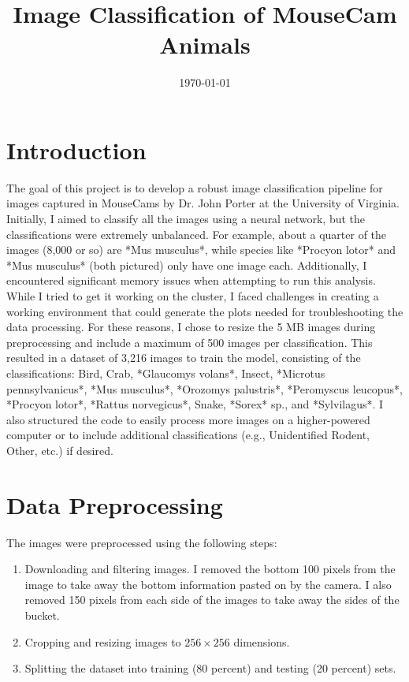 \documentclass[a4paper,12pt]{article}
\title{\textbf{Image Classification of MouseCam Animals}}
\author{}
\date{\today}
\begin{document}
\maketitle


\vspace{1cm}

\section{Introduction}
The goal of this project is to develop a robust image classification pipeline for images captured in MouseCams by Dr. John Porter at the University of Virginia. Initially, I aimed to classify all the images using a neural network, but the classifications were extremely unbalanced. For example, about a quarter of the images (8,000 or so) are *Mus musculus*, while species like *Procyon lotor* and *Mus musculus* (both pictured) only have one image each. Additionally, I encountered significant memory issues when attempting to run this analysis. While I tried to get it working on the cluster, I faced challenges in creating a working environment that could generate the plots needed for troubleshooting the data processing. For these reasons, I chose to resize the 5 MB images during preprocessing and include a maximum of 500 images per classification. This resulted in a dataset of 3,216 images to train the model, consisting of the classifications: Bird, Crab, *Glaucomys volans*, Insect, *Microtus pennsylvanicus*, *Mus musculus*, *Orozomys palustris*, *Peromyscus leucopus*, *Procyon lotor*, *Rattus norvegicus*, Snake, *Sorex* sp., and *Sylvilagus*. I also structured the code to easily process more images on a higher-powered computer or to include additional classifications (e.g., Unidentified Rodent, Other, etc.) if desired.


\section{Data Preprocessing}
The images were preprocessed using the following steps:
\begin{enumerate}
    \item Downloading and filtering images. I removed the bottom 100 pixels from the image to take away the bottom information pasted on by the camera. I also removed 150 pixels from each side of the images to take away the sides of the bucket.
    \item Cropping and resizing images to $256 \times 256$ dimensions.
    \item Splitting the dataset into training (80 percent) and testing (20 percent) sets.
\end{enumerate}
\end{document}
